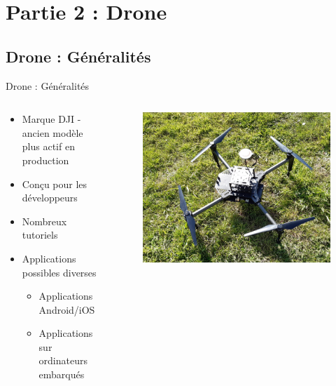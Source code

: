 \section{Partie 2 : Drone}
    \subsection{Drone : Généralités}
        \begin{frame}[allowframebreaks]{Drone : Généralités}
            \begin{columns}[T]
                \begin{column}{0.5\textwidth}
                    \begin{exampleblock}{}
                        \begin{itemize}
                            \item Marque DJI - ancien modèle plus actif en production
                            \item Conçu pour les développeurs
                            \item Nombreux tutoriels
                            \item Applications possibles diverses
                                \begin{itemize}
                                    \item Applications Android/iOS
                                    \item Applications sur ordinateurs embarqués
                                \end{itemize}
                        \end{itemize}
                    \end{exampleblock}
                \end{column}\hfill
                \begin{column}{0.5\textwidth}
                    \begin{figure}
                        \includegraphics[width=1\linewidth]{images/drone.png}

\end{figure}
\end{column}
\end{columns}
\end{frame}
